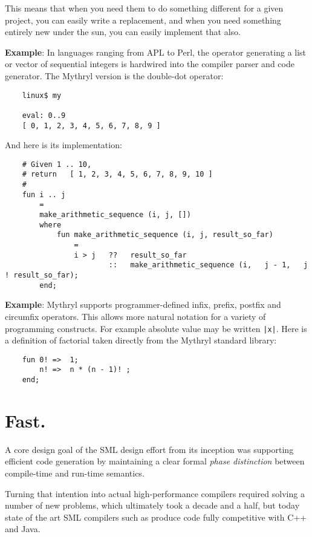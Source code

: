 This means that when you need them to do something different for a given 
project, you can easily write a replacement, and when you need something 
entirely new under the sun, you can easily implement that also.

{\bf Example}:  In languages ranging from APL to Perl, the operator generating 
a list or vector of sequential integers is hardwired into the compiler 
parser and code generator.  The Mythryl version is the double-dot operator:

\begin{verbatim}
    linux$ my

    eval: 0..9
    [ 0, 1, 2, 3, 4, 5, 6, 7, 8, 9 ]
\end{verbatim}

And here is its implementation:

\begin{verbatim}
    # Given 1 .. 10,
    # return   [ 1, 2, 3, 4, 5, 6, 7, 8, 9, 10 ]
    #
    fun i .. j
        =
        make_arithmetic_sequence (i, j, [])
        where
            fun make_arithmetic_sequence (i, j, result_so_far)
                =
                i > j   ??   result_so_far
                        ::   make_arithmetic_sequence (i,   j - 1,   j ! result_so_far);
        end;
\end{verbatim}

{\bf Example}:  Mythryl supports programmer-defined infix, prefix, postfix and 
circumfix operators.  This allows more natural notation for a variety of 
programming constructs.  For example absolute value may be written {\tt |x|}. 
Here is a definition of factorial taken directly from the Mythryl standard library:

\begin{verbatim}
    fun 0! =>  1;
        n! =>  n * (n - 1)! ;
    end;
\end{verbatim}




\section{Fast.}

A core design goal of the {\sc SML} design effort from its inception was 
supporting efficient code generation by maintaining a 
clear formal {\em phase distinction} between compile-time 
and run-time semantics.

Turning that intention into actual high-performance compilers required solving a number 
of new problems, which ultimately took a decade and a half, but today state of the art 
{\sc SML} compilers such as 
  
produce code fully competitive with C++ and Java.

